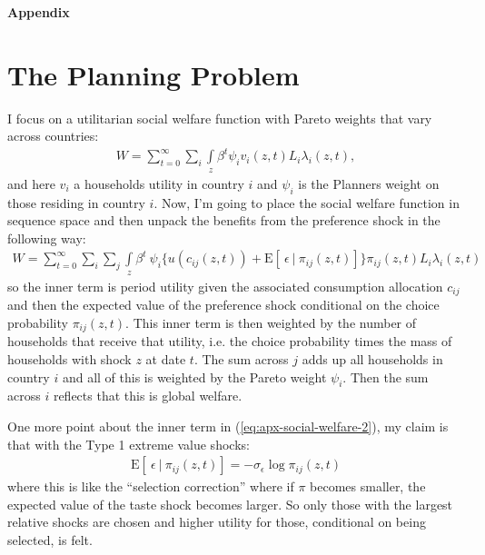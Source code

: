 \documentclass[12pt,pdftex]{article}
\begin{document}
\begin{onehalfspacing}
\clearpage
\newpage

\begin{center}
\textbf{\Large Appendix}
\end{center}


\section{The Planning Problem}\label{sec:apx-planner}

I focus on a utilitarian social welfare function with Pareto weights that vary across countries:
\begin{align}
W = \sum_{t=0}^{\infty} \sum_{i}  \int\limits_{z} \beta^{t} \psi_{i} v_{i}(z,t) L_{i}\lambda_{i}(z,t),
\label{eq:apx-social-welfare}
\end{align}
and here $v_i$ a households utility in country $i$ and $\psi_{i}$ is the Planners weight on those residing in country $i$. Now, I'm going to place the social welfare function in sequence space and then unpack the benefits from the preference shock in the following way:
\begin{align}
W = \sum_{t=0}^{\infty}  \sum_{i}  \sum_{j}  \int\limits_{z}  \beta^{t} \  \psi_{i} \bigg \{  u(c_{ij}(z, t) ) + \mathrm{E}[ \ \epsilon \ | \ \pi_{ij}(z,t) ] \bigg \}\pi_{ij}(z,t) L_{i} \lambda_{i}(z, t)
\label{eq:apx-social-welfare-2}
\end{align}
so the inner term is period utility given the associated consumption allocation $c_{ij}$ and then the expected value of the preference shock conditional on the choice probability $\pi_{ij}(z,t)$. This inner term is then weighted by the number of households that receive that utility, i.e. the choice probability times the mass of households with shock $z$ at date $t$. The sum across $j$ adds up all households in country $i$ and all of this is weighted by the Pareto weight $\psi_{i}$. Then the sum across $i$ reflects that this is global welfare.

One more point about the inner term in (\ref{eq:apx-social-welfare-2}), my claim is that with the Type 1 extreme value shocks:
\begin{align}
\mathrm{E}[ \ \epsilon \ | \ \pi_{ij}(z,t) ] = -\sigma_{\epsilon} \log \pi_{ij}(z,t)
\end{align}
where this is like the ``selection correction'' where if $\pi$ becomes smaller, the expected value of the taste shock becomes larger. So only those with the largest relative shocks are chosen and higher utility for those, conditional on being selected, is felt.


\end{onehalfspacing}
\end{document}

